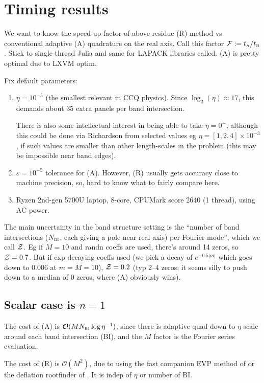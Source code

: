\documentclass[11pt]{article}
\newcommand{\ben}{\begin{enumerate}}
\newcommand{\een}{\end{enumerate}}
\newcommand{\tbox}[1]{{\mbox{\tiny #1}}}
\newcommand{\eps}{\varepsilon}
\newcommand{\bigO}{{\mathcal O}}
\begin{document}
\section{Timing results}

We want to know the speed-up factor of above residue (R) method vs
conventional adaptive (A) quadrature on the real axis.
Call this
factor ${\cal F} := t_\tbox{A}/t_\tbox{R}$.
Stick to single-thread Julia and same for LAPACK libraries called.
(A) is pretty optimal due to LXVM optim.

Fix default parameters:
\ben
\item
  $\eta=10^{-5}$ (the smallest relevant in CCQ physics).
  Since $\log_2(\eta) \approx 17$, this demands about 35 extra panels per band
  intersection.

  There is also some intellectual interest in being able to take
  $\eta=0^+$, although this could be done via Richardson from selected
  values eg $\eta = [1,2,4]\times 10^{-3}$, if such values are smaller than
  other length-scales in the problem (this may be impossible near band edges).
\item
  $\eps = 10^{-5}$ tolerance for (A). However, (R) usually gets accuracy
  close to machine precision,
  so, hard to know what to fairly compare here.
\item Ryzen 2nd-gen 5700U laptop, 8-core, CPUMark score 2640 (1 thread),
  using AC power.
\een
  
The main uncertainty in the band structure setting is the
``number of band intersections ($N_\tbox{BI}$, each giving a pole near real axis) per Fourier mode'',
which we call ${\cal Z}$.
Eg if $M=10$ and randn coeffs are used, there's around 14 zeros,
so ${\cal Z} = 0.7$.
But if exp decaying
coeffs used (we pick a decay of $e^{-0.5|m|}$ which goes down to
0.006 at $m=M=10$),
${\cal Z} = 0.2$ (typ 2--4 zeros; it seems silly to push down
to a median of 0 zeros, where (A) obviously wins).


\subsection{Scalar case is $n=1$}

The cost of (A) is $\bigO(M N_\tbox{BI} \log \eta^{-1})$,
since there is adaptive quad down to $\eta$ scale around each band intersection
(BI), and the $M$ factor is the Fourier series evaluation.

The cost of (R) is $\bigO(M^2)$, due to using the fast companion EVP
method of \cite{aurentz1,aurentz2} or the deflation rootfinder
of \cite{skowron}.
It is indep of $\eta$ or number of BI.
\end{document}
